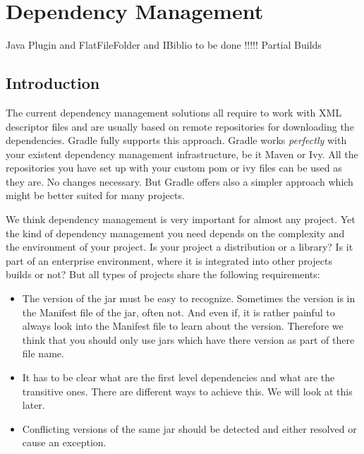 \chapter{Dependency Management}
\label{cha:dependency_management}
Java Plugin and FlatFileFolder and IBiblio to be done !!!!! Partial Builds
\section{Introduction} %
\label{sec:Introduction}
The current dependency management solutions all require to work with XML descriptor files and are usually based on remote repositories for downloading the dependencies. Gradle fully supports this approach. Gradle works \emph{perfectly} with your existent dependency management infrastructure, be it Maven or Ivy. All the repositories you have set up with your custom pom or ivy files can be used as they are. No changes necessary. But Gradle offers also a simpler approach which might be better suited for many projects. 

We think dependency management is very important for almost any project. Yet the kind of dependency management you need depends on the complexity and the environment of your project. Is your project a distribution or a library? Is it part of an enterprise environment, where it is integrated into other projects builds or not? But all types of projects share the following requirements:
\begin{itemize}
\item The version of the jar must be easy to recognize. Sometimes the version is in the Manifest file of the jar, often not. And even if, it is rather painful to always look into the Manifest file to learn about the version. Therefore we think that you should only use jars which have there version as part of there file name.
\item It has to be clear what are the first level dependencies and what are the transitive ones. There are different ways to achieve this. We will look at this later.
\item Conflicting versions of the same jar should be detected and either resolved or cause an exception.
\end{itemize}


